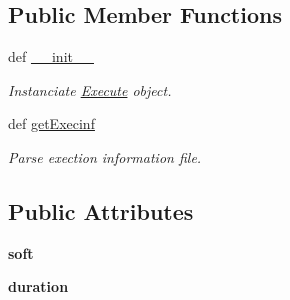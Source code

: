 \subsection*{\-Public \-Member \-Functions}
\begin{DoxyCompactItemize}
\item 
\hypertarget{classiRNA__stat_1_1Execute_1_1Execute_a8d1fed87f93069b531a06e259624209c}{
def \hyperlink{classiRNA__stat_1_1Execute_1_1Execute_a8d1fed87f93069b531a06e259624209c}{\-\_\-\-\_\-init\-\_\-\-\_\-}}
\label{classiRNA__stat_1_1Execute_1_1Execute_a8d1fed87f93069b531a06e259624209c}

\begin{DoxyCompactList}\small\item\em \-Instanciate \hyperlink{classiRNA__stat_1_1Execute_1_1Execute}{\-Execute} object. \end{DoxyCompactList}\item 
def \hyperlink{classiRNA__stat_1_1Execute_1_1Execute_ae77dfc2a5a223b141948108237c52684}{get\-Execinf}
\begin{DoxyCompactList}\small\item\em \-Parse exection information file. \end{DoxyCompactList}\end{DoxyCompactItemize}
\subsection*{\-Public \-Attributes}
\begin{DoxyCompactItemize}
\item 
\hypertarget{classiRNA__stat_1_1Execute_1_1Execute_ae9fc0f8314ca6b4e441004ed59326ed2}{
{\bfseries soft}}
\label{classiRNA__stat_1_1Execute_1_1Execute_ae9fc0f8314ca6b4e441004ed59326ed2}

\item 
\hypertarget{classiRNA__stat_1_1Execute_1_1Execute_a99ab36fea095dea138c8393b10e2ba30}{
{\bfseries duration}}
\label{classiRNA__stat_1_1Execute_1_1Execute_a99ab36fea095dea138c8393b10e2ba30}

\end{DoxyCompactItemize}


